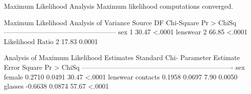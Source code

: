 \documentclass{article}
\begin{document}
\begin{Woutput}
                   Maximum Likelihood Analysis
           Maximum likelihood computations converged.

     Maximum Likelihood Analysis of Variance
Source               DF   Chi-Square    Pr > ChiSq
--------------------------------------------------
sex                   1        30.47        <.0001
lenswear              2        66.85        <.0001
Likelihood Ratio      2        17.83        0.0001

             Analysis of Maximum Likelihood Estimates
                                 Standard        Chi-
Parameter             Estimate      Error      Square    Pr > ChiSq
-------------------------------------------------------------------
sex       female        0.2710     0.0491       30.47        <.0001
lenswear  contacts      0.1958     0.0697        7.90        0.0050
          glasses      -0.6638     0.0874       57.67        <.0001
\end{Woutput}
\end{document}
